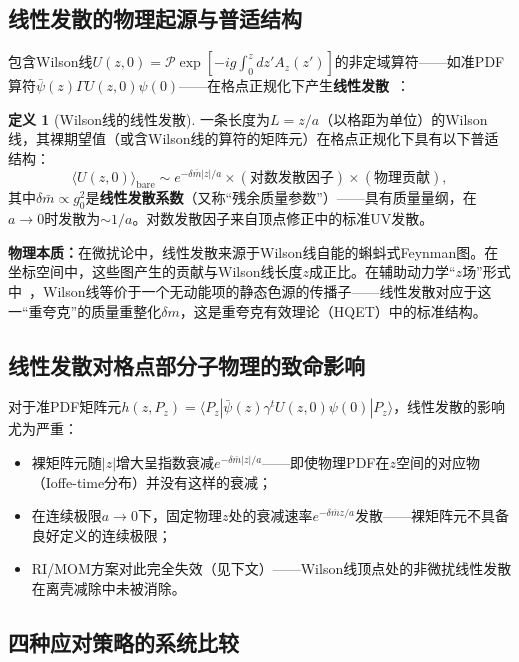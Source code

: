 \documentclass[12pt,a4paper]{ctexart}
\theoremstyle{definition}
\newtheorem{definition}{定义}[section]
\begin{document}
\subsection{线性发散的物理起源与普适结构}

包含Wilson线$U(z,0) = \mathcal{P}\exp[-ig\int_0^z dz' A_z(z')]$的非定域算符——如准PDF算符$\bar\psi(z)\Gamma U(z,0)\psi(0)$——在格点正规化下产生\textbf{线性发散}~\cite{Huo2021self,Chen2018WLrenorm}：

\begin{definition}[Wilson线的线性发散]
一条长度为$L = z/a$（以格距为单位）的Wilson线，其裸期望值（或含Wilson线的算符的矩阵元）在格点正规化下具有以下普适结构：
\begin{equation}
\boxed{\langle U(z,0) \rangle_{\text{bare}} \sim e^{-\delta\bar{m} |z|/a} \times (\text{对数发散因子}) \times (\text{物理贡献})},
\label{eq:linear_divergence}
\end{equation}
其中$\delta\bar{m} \propto g_0^2$是\textbf{线性发散系数}（又称``残余质量参数''）——具有质量量纲，在$a\to 0$时发散为$\sim 1/a$。对数发散因子来自顶点修正中的标准UV发散。
\end{definition}

\textbf{物理本质：}在微扰论中，线性发散来源于Wilson线自能的蝌蚪式Feynman图。在坐标空间中，这些图产生的贡献与Wilson线长度$z$成正比。在辅助动力学``$z$场''形式中~\cite{Chen2018WLrenorm}，Wilson线等价于一个无动能项的静态色源的传播子——线性发散对应于这一``重夸克''的质量重整化$\delta m$，这是重夸克有效理论（HQET）中的标准结构。

\subsection{线性发散对格点部分子物理的致命影响}

对于准PDF矩阵元$h(z, P_z) = \langle P_z | \bar\psi(z)\gamma^t U(z,0)\psi(0) | P_z \rangle$，线性发散的影响尤为严重：
\begin{itemize}[nosep]
    \item 裸矩阵元随$|z|$增大呈指数衰减$e^{-\delta\bar m |z|/a}$——即使物理PDF在$z$空间的对应物（Ioffe-time分布）并没有这样的衰减；
    \item 在连续极限$a\to 0$下，固定物理$z$处的衰减速率$e^{-\delta\bar m z/a}$发散——裸矩阵元不具备良好定义的连续极限；
    \item RI/MOM方案对此完全失效（见下文）——Wilson线顶点处的非微扰线性发散在离壳减除中未被消除。
\end{itemize}

\subsection{四种应对策略的系统比较}
\end{document}
